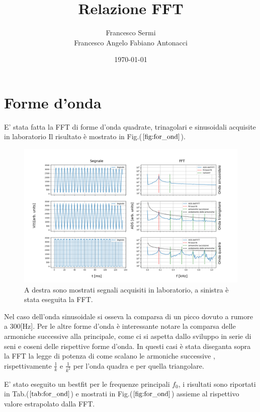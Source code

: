 \documentclass{article}
\author{Francesco Sermi\\Francesco Angelo Fabiano Antonacci}
\date{\today}
\title{Relazione FFT}
\begin{document}
\maketitle

\section{Forme d'onda}
    
        E' stata fatta la FFT di forme d'onda quadrate, trinagolari e sinusoidali
        acquisite in laboratorio
        Il risultato è mostrato in Fig.($\ref{fig:for_ond}$).

    \begin{figure}[H]
        \centering
        \includegraphics[width=\textwidth]{FFT5/FFTwaveforms1.png}
        \caption{A destra sono mostrati segnali acquisiti in laboratorio, a sinistra 
                è stata eseguita la FFT.}
        \label{fig:for_ond}
    \end{figure}    

        Nel caso dell'onda sinusoidale si osseva la comparsa di un picco dovuto a 
        rumore a $300$[Hz].
        Per le altre forme d'onda è interessante notare la comparsa delle 
        armoniche successive alla principale, come ci si aspetta dallo 
        sviluppo in serie di seni e coseni delle rispettive forme d'onda.
        In questi casi è stata diseganta sopra la FFT
        la legge di potenza di come scalano le armoniche successive , rispettivamente
        $\frac{1}{k}$ e $\frac{1}{k^2}$ per l'onda quadra e  per quella triangolare.

        E' stato eseguito un bestfit per le frequenze principali $f_0$, i risultati 
        sono riportati in Tab.($\ref{tab:for_ond}$) e 
        mostrati in Fig.($\ref{fig:for_ond}$) assieme al rispettivo valore 
        estrapolato dalla FFT.
\end{document}
